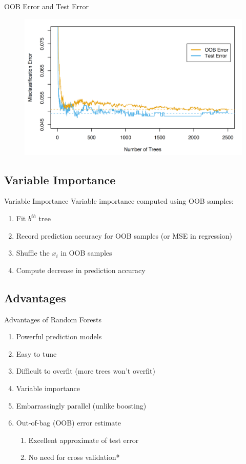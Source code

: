 \documentclass[pdf]{beamer}
\begin{document}
		\begin{frame}{OOB Error and Test Error}
			\begin{figure}
				\includegraphics[scale = 0.25]{oob_error.png}
			\end{figure}		
    		\end{frame}
		
		
	\subsection{Variable Importance}
		\begin{frame}{Variable Importance}
			Variable importance computed using OOB samples:
			
			
			\begin{enumerate} [  1.]
				\item Fit $b^{th}$ tree
				\item Record prediction accuracy for OOB samples (or MSE in regression)
				\item Shuffle the $x_i$ in OOB samples
				\item Compute decrease in prediction accuracy
			\end{enumerate}
		\end{frame}
	
	\subsection{Advantages}
		\begin{frame}{Advantages of Random Forests}
			\begin{enumerate}
				\item Powerful prediction models
				\item Easy to tune
				\item Difficult to overfit (more trees won't overfit)
				\item Variable importance
				\item Embarrassingly parallel (unlike boosting)
				\item Out-of-bag (OOB) error estimate
					\begin{enumerate}[1]
						\item Excellent approximate of test error
						\item No need for cross validation*
					\end{enumerate}

			\end{enumerate}
		\end{frame}
\end{document}

